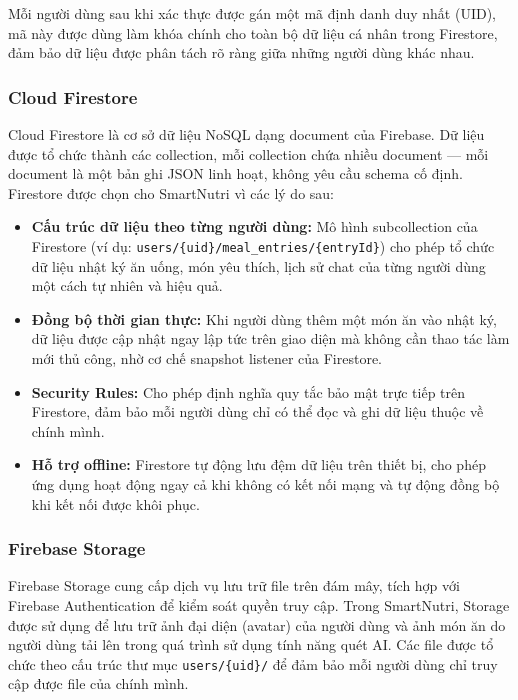 Mỗi người dùng sau khi xác thực được gán một mã định danh duy nhất (UID), mã này được dùng làm khóa chính cho toàn bộ dữ liệu cá nhân trong Firestore, đảm bảo dữ liệu được phân tách rõ ràng giữa những người dùng khác nhau.

\subsubsection{Cloud Firestore}

Cloud Firestore \cite{firebase_firestore} là cơ sở dữ liệu NoSQL dạng document của Firebase. Dữ liệu được tổ chức thành các collection, mỗi collection chứa nhiều document — mỗi document là một bản ghi JSON linh hoạt, không yêu cầu schema cố định. Firestore được chọn cho SmartNutri vì các lý do sau:

\begin{itemize}
    \item \textbf{Cấu trúc dữ liệu theo từng người dùng:} Mô hình subcollection của Firestore (ví dụ: \texttt{users/\{uid\}/meal\_entries/\{entryId\}}) cho phép tổ chức dữ liệu nhật ký ăn uống, món yêu thích, lịch sử chat của từng người dùng một cách tự nhiên và hiệu quả.
    \item \textbf{Đồng bộ thời gian thực:} Khi người dùng thêm một món ăn vào nhật ký, dữ liệu được cập nhật ngay lập tức trên giao diện mà không cần thao tác làm mới thủ công, nhờ cơ chế snapshot listener của Firestore.
    \item \textbf{Security Rules:} Cho phép định nghĩa quy tắc bảo mật trực tiếp trên Firestore, đảm bảo mỗi người dùng chỉ có thể đọc và ghi dữ liệu thuộc về chính mình.
    \item \textbf{Hỗ trợ offline:} Firestore tự động lưu đệm dữ liệu trên thiết bị, cho phép ứng dụng hoạt động ngay cả khi không có kết nối mạng và tự động đồng bộ khi kết nối được khôi phục.
\end{itemize}

\subsubsection{Firebase Storage}

Firebase Storage \cite{firebase_storage} cung cấp dịch vụ lưu trữ file trên đám mây, tích hợp với Firebase Authentication để kiểm soát quyền truy cập. Trong SmartNutri, Storage được sử dụng để lưu trữ ảnh đại diện (avatar) của người dùng và ảnh món ăn do người dùng tải lên trong quá trình sử dụng tính năng quét AI. Các file được tổ chức theo cấu trúc thư mục \texttt{users/\{uid\}/} để đảm bảo mỗi người dùng chỉ truy cập được file của chính mình.

